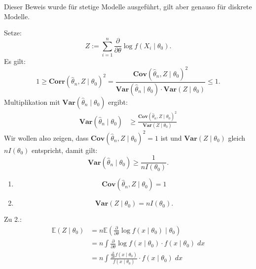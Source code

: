\documentclass[10pt]{article}
\newcommand{\EW}{\mathbb{E}} %
\newcommand{\ablt}{\frac{\partial}{\partial \theta}}
\newenvironment{BWS}[1][]
{\begin{Beweis}[frametitle=#1]}{\end{Beweis}}
\begin{document}
	\begin{BWS}[Beweis 1.4.1 (Cramér-Rao-Schranke)]
		Dieser Beweis wurde für stetige Modelle ausgeführt, gilt aber genauso für diskrete Modelle.
		
		Setze:
		\begin{equation*}
			Z := \sum_{i=1}^{n} \frac{\partial}{\partial \theta} \log f(X_i \mid \theta_0).
		\end{equation*}
		Es gilt:
		\begin{equation*}
			1 \geq \textbf{Corr}(\hat{\theta}_n, Z \mid \theta_0)^2 = \frac{\textbf{Cov}(\hat{\theta}_n, Z \mid \theta_0)^2}{\textbf{Var}(\hat{\theta}_n \mid \theta_0) \cdot \textbf{Var}(Z \mid \theta_0)} \leq 1.
		\end{equation*}
		Multiplikation mit $\textbf{Var}(\hat{\theta}_n \mid \theta_0)$ ergibt:
		\begin{equation*}
			\begin{split}
				\textbf{Var}(\hat{\theta}_n \mid \theta_0) &\geq \frac{\textbf{Cov}(\hat{\theta}_n, Z \mid \theta_0)^2}{\textbf{Var}(Z \mid \theta_0)}
			\end{split}
		\end{equation*}
		Wir wollen also zeigen, dass $\textbf{Cov}(\hat{\theta}_n, Z \mid \theta_0)^2 = 1$ ist und $\textbf{Var}(Z \mid \theta_0)$ gleich $nI(\theta_0)$ entspricht, damit gilt:
		\begin{equation*}
			\textbf{Var}(\hat{\theta}_n \mid \theta_0) \geq \frac{1}{nI(\theta_0)}.
		\end{equation*}
		\begin{enumerate}
			\item 
			\begin{equation*}
				\textbf{Cov}(\hat{\theta}_n, Z \mid \theta_0) = 1
			\end{equation*}
			\item 
			\begin{equation*}
				\textbf{Var}(Z\mid \theta_0) = nI(\theta_0).
			\end{equation*}
		\end{enumerate}
		Zu 2.:
		\begin{equation*}
			\begin{split}
				\EW (Z \mid \theta_0) &=  n\EW\left(\ablt \log f(x \mid \theta_0)\mid \theta_0\right)\\
				&= n \int \ablt \log f(x \mid \theta_0) \cdot f(x \mid \theta_0) \; dx\\
				&= n \int \frac{\ablt f(x \mid \theta_0)}{f(x \mid \theta_0)} \cdot f(x \mid \theta_0) \; dx\\

\end{split}
\end{equation*}
\end{BWS}
\end{document}
